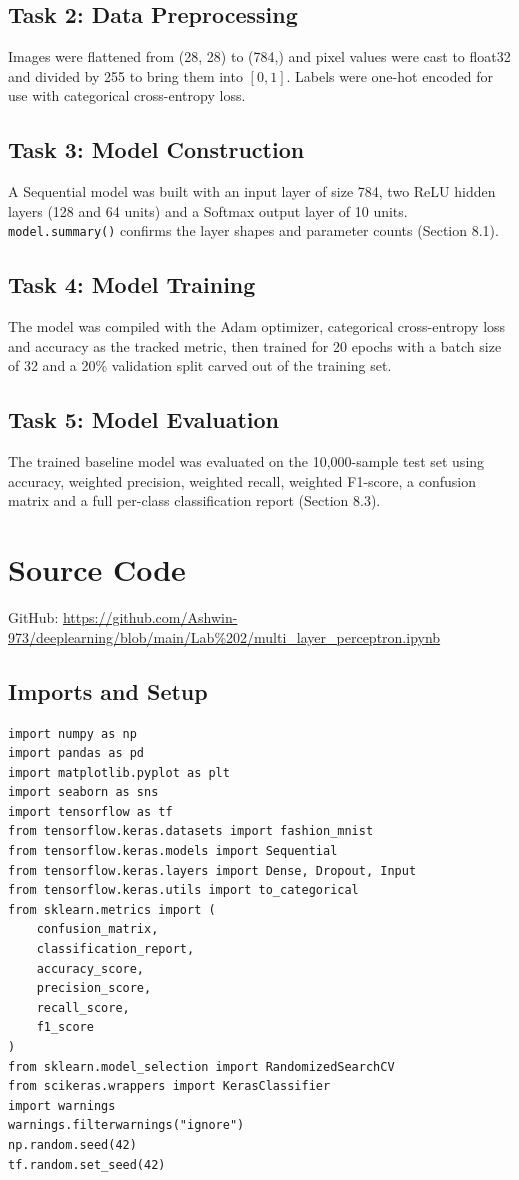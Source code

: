 \documentclass[11pt]{article}
\begin{document}
\subsection*{Task 2: Data Preprocessing}
Images were flattened from (28, 28) to (784,) and pixel values were cast to float32 and divided by 255 to bring them into $[0, 1]$. Labels were one-hot encoded for use with categorical cross-entropy loss.

\subsection*{Task 3: Model Construction}
A Sequential model was built with an input layer of size 784, two ReLU hidden layers (128 and 64 units) and a Softmax output layer of 10 units. \texttt{model.summary()} confirms the layer shapes and parameter counts (Section 8.1).

\subsection*{Task 4: Model Training}
The model was compiled with the Adam optimizer, categorical cross-entropy loss and accuracy as the tracked metric, then trained for 20 epochs with a batch size of 32 and a 20\% validation split carved out of the training set.

\subsection*{Task 5: Model Evaluation}
The trained baseline model was evaluated on the 10,000-sample test set using accuracy, weighted precision, weighted recall, weighted F1-score, a confusion matrix and a full per-class classification report (Section 8.3).

\section{Source Code}
GitHub: \url{https://github.com/Ashwin-973/deeplearning/blob/main/Lab%202/multi_layer_perceptron.ipynb}

\subsection{Imports and Setup}
\begin{lstlisting}
import numpy as np
import pandas as pd
import matplotlib.pyplot as plt
import seaborn as sns
import tensorflow as tf
from tensorflow.keras.datasets import fashion_mnist
from tensorflow.keras.models import Sequential
from tensorflow.keras.layers import Dense, Dropout, Input
from tensorflow.keras.utils import to_categorical
from sklearn.metrics import (
    confusion_matrix,
    classification_report,
    accuracy_score,
    precision_score,
    recall_score,
    f1_score
)
from sklearn.model_selection import RandomizedSearchCV
from scikeras.wrappers import KerasClassifier
import warnings
warnings.filterwarnings("ignore")
np.random.seed(42)
tf.random.set_seed(42)
\end{lstlisting}
\end{document}

